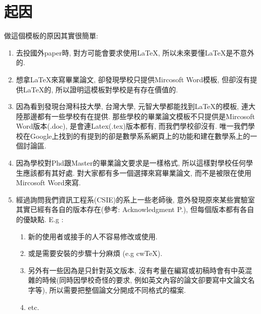 
\section{起因}

做這個模板的原因其實很簡單:

\begin{enumerate}
  \item 去投國外paper時, 對方可能會要求使用LaTeX, 所以未來要懂LaTeX是不意外的.

  \item 想拿LaTeX來寫畢業論文, 卻發現學校只提供Mircosoft Word模板, 但卻沒有提供LaTeX的, 所以證明這模板對學校是有存在價值的.

  \item 因為看到發現台灣科技大學\cite{web:latex:template:ntust}, 台灣大學\cite{web:latex:template:ntu}, 元智大學\cite{web:latex:template:ntust}都能找到LaTeX的模板, 連大陸那邊都有一些學校有在提供. 那些學校的畢業論文模板不只提供是Mircosoft Word版本(.doc), 是會連Latex(.tex)版本都有, 而我們學校卻沒有. 唯一我們學校在Google上找到的有提到的卻是數學系系網頁上的功能\cite{web:latex:ncku_math_introduction}和建在數學系上的一個討論區\cite{web:latex:ncku_math_forum}.

  \item 因為學校對Phd跟Master的畢業論文要求是一樣格式, 所以這樣對學校任何學生應該都有其好處. 對大家都有多一個選擇來寫畢業論文, 而不是被限在使用Mircosoft Word來寫.

  \item 經過詢問我們資訊工程系(CSIE)的系上一些老師後, 意外發現原來某些實驗室其實已經有各自的版本存在(參考: Acknowledgment P.\pageref{acknowledgments-chi}), 但每個版本都有各自的優缺點. E.g :

    \begin{enumerate}

      \item 新的使用者或接手的人不容易修改或使用.

      \item 或是需要安裝的步驟十分麻煩 (e.g cwTeX\cite{web:latex:cwtex}).

      \item 另外有一些因為是只針對英文版本, 沒有考量在編寫或初稿時會有中英混雜的時候(同時因學校奇怪的要求, 例如英文內容的論文卻要寫中文論文名字等), 所以需要把整個論文分開成不同格式的檔案.

      \item etc.

    \end{enumerate}

\end{enumerate}

